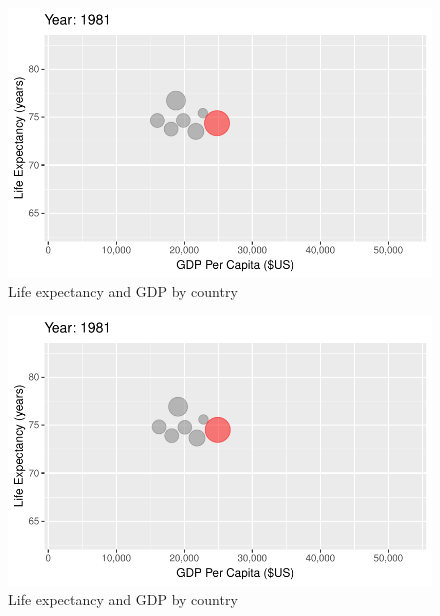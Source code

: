 \documentclass[
  letterpaper,
  DIV=11,
  numbers=noendperiod]{scrreport}
\theoremstyle{definition}
\theoremstyle{remark}
\begin{document}
\begin{figure}

{\centering \includegraphics{index_files/figure-pdf/fig-anim-country-53.pdf}

}

\caption{\label{fig-anim-country-53}Life expectancy and GDP by country}

\end{figure}

\begin{figure}

{\centering \includegraphics{index_files/figure-pdf/fig-anim-country-54.pdf}

}

\caption{\label{fig-anim-country-54}Life expectancy and GDP by country}

\end{figure}
\end{document}
